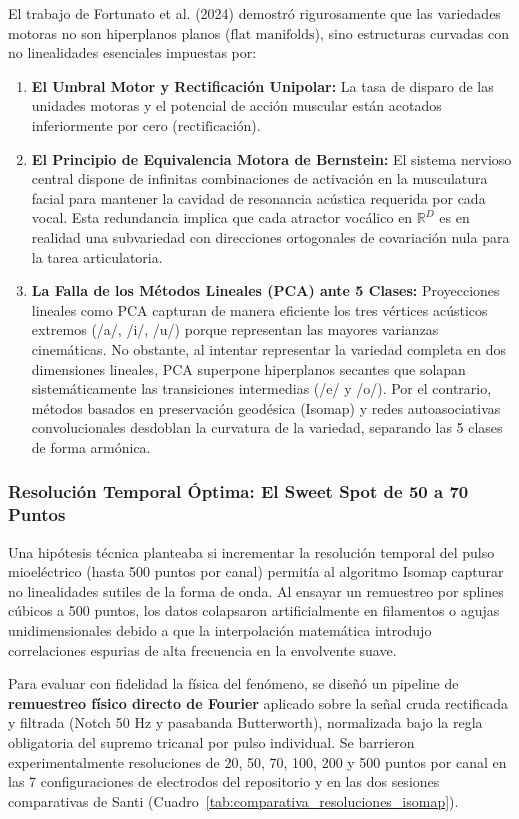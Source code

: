 \documentclass[11pt,a4paper,openany]{book}
\theoremstyle{definition}
\begin{document}
El trabajo de Fortunato et al. (2024) demostró rigurosamente que las variedades motoras no son hiperplanos planos ($\text{flat manifolds}$), sino estructuras curvadas con no linealidades esenciales impuestas por:
\begin{enumerate}
    \item \textbf{El Umbral Motor y Rectificación Unipolar:} La tasa de disparo de las unidades motoras y el potencial de acción muscular están acotados inferiormente por cero ($\text{rectificación}$).
    \item \textbf{El Principio de Equivalencia Motora de Bernstein:} El sistema nervioso central dispone de infinitas combinaciones de activación en la musculatura facial para mantener la cavidad de resonancia acústica requerida por cada vocal. Esta redundancia implica que cada atractor vocálico en $\mathbb{R}^D$ es en realidad una subvariedad con direcciones ortogonales de covariación nula para la tarea articulatoria.
    \item \textbf{La Falla de los Métodos Lineales (PCA) ante 5 Clases:} Proyecciones lineales como PCA capturan de manera eficiente los tres vértices acústicos extremos (/a/, /i/, /u/) porque representan las mayores varianzas cinemáticas. No obstante, al intentar representar la variedad completa en dos dimensiones lineales, PCA superpone hiperplanos secantes que solapan sistemáticamente las transiciones intermedias (/e/ y /o/). Por el contrario, métodos basados en preservación geodésica (Isomap) y redes autoasociativas convolucionales desdoblan la curvatura de la variedad, separando las 5 clases de forma armónica.
\end{enumerate}

\subsubsection{Resolución Temporal Óptima: El Sweet Spot de 50 a 70 Puntos}
\label{subsubsec:sweet_spot_resolucion}

Una hipótesis técnica planteaba si incrementar la resolución temporal del pulso mioeléctrico (hasta 500 puntos por canal) permitía al algoritmo Isomap capturar no linealidades sutiles de la forma de onda. Al ensayar un remuestreo por splines cúbicos a 500 puntos, los datos colapsaron artificialmente en filamentos o agujas unidimensionales debido a que la interpolación matemática introdujo correlaciones espurias de alta frecuencia en la envolvente suave.

Para evaluar con fidelidad la física del fenómeno, se diseñó un pipeline de \textbf{remuestreo físico directo de Fourier} aplicado sobre la señal cruda rectificada y filtrada (Notch 50 Hz y pasabanda Butterworth), normalizada bajo la regla obligatoria del supremo tricanal por pulso individual. Se barrieron experimentalmente resoluciones de 20, 50, 70, 100, 200 y 500 puntos por canal en las 7 configuraciones de electrodos del repositorio y en las dos sesiones comparativas de Santi (Cuadro~\ref{tab:comparativa_resoluciones_isomap}).
\end{document}
